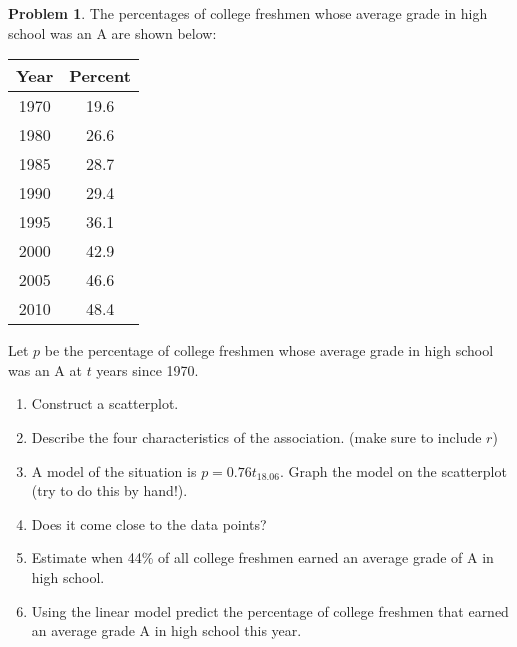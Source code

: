 \documentclass[11pt]{scrartcl}
\theoremstyle{definition}
\newtheorem{problem}[theorem]{Problem}
\begin{document}
\begin{problem}
	The percentages of college freshmen whose average grade in high school was an A are shown below:
	\begin{center}
		\begin{tabular}{c|c}
Year & Percent \\ \hline
1970 & 19.6    \\
1980 & 26.6    \\
1985 & 28.7    \\
1990 & 29.4    \\
1995 & 36.1    \\
2000 & 42.9    \\
2005 & 46.6    \\
2010 & 48.4   
\end{tabular}
	\end{center}
Let $p$ be the percentage of college freshmen whose average grade in high school was an A at $t$ years since 1970.
\begin{enumerate}[label=\alph*)]
	\item Construct a scatterplot.
	\item Describe the four characteristics of the association. (make sure to include $r$)
	\item A model of the situation is $p=0.76t_18.06$. Graph the model on the scatterplot (try to do this by hand!). 
	\item Does it come close to the data points?
	\item Estimate when 44\% of all college freshmen earned an average grade of A in high school.
	\item Using the linear model predict the percentage of college freshmen that earned an average grade A in high school this year.
\end{enumerate}		
\end{problem}
\end{document}
